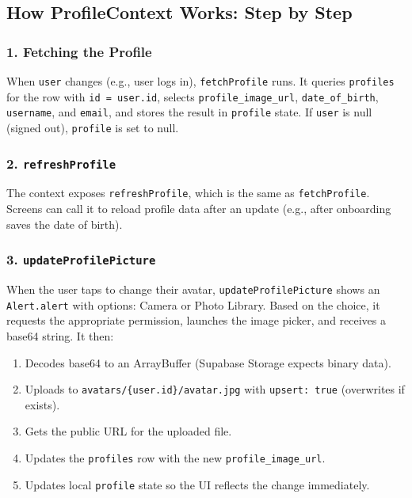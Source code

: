 \documentclass[11pt,a4paper]{article}
\begin{document}
\subsection{How ProfileContext Works: Step by Step}

\subsubsection{1. Fetching the Profile}

When \texttt{user} changes (e.g., user logs in), \texttt{fetchProfile} runs. It queries \texttt{profiles} for the row with \texttt{id = user.id}, selects \texttt{profile\_image\_url}, \texttt{date\_of\_birth}, \texttt{username}, and \texttt{email}, and stores the result in \texttt{profile} state. If \texttt{user} is null (signed out), \texttt{profile} is set to null.

\subsubsection{2. \texttt{refreshProfile}}

The context exposes \texttt{refreshProfile}, which is the same as \texttt{fetchProfile}. Screens can call it to reload profile data after an update (e.g., after onboarding saves the date of birth).

\subsubsection{3. \texttt{updateProfilePicture}}

When the user taps to change their avatar, \texttt{updateProfilePicture} shows an \texttt{Alert.alert} with options: Camera or Photo Library. Based on the choice, it requests the appropriate permission, launches the image picker, and receives a base64 string. It then:

\begin{enumerate}
    \item Decodes base64 to an ArrayBuffer (Supabase Storage expects binary data).
    \item Uploads to \texttt{avatars/\{user.id\}/avatar.jpg} with \texttt{upsert: true} (overwrites if exists).
    \item Gets the public URL for the uploaded file.
    \item Updates the \texttt{profiles} row with the new \texttt{profile\_image\_url}.
    \item Updates local \texttt{profile} state so the UI reflects the change immediately.
\end{enumerate}
\end{document}
